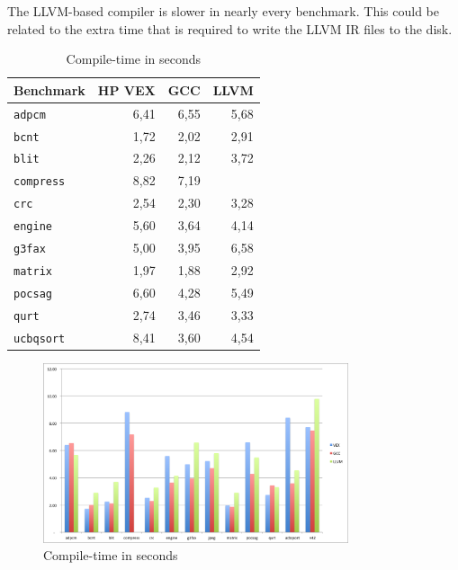 The LLVM-based compiler is slower in nearly every benchmark. This could be related to the extra time that is required to write the LLVM IR files to the disk. %

\begin{table}
  \centering
    \begin{tabular}{|l|r|r|r|}
    \hline
    \textbf{Benchmark} & \multicolumn{1}{|r|}{\textbf{HP VEX}} & \multicolumn{1}{|r|}{\textbf{GCC}}  & \multicolumn{1}{|r|}{\textbf{LLVM}} \\ \hline
	\texttt{adpcm} 		& 6,41 & 6,55 & 5,68 \\ \hline
	\texttt{bcnt} 		& 1,72 & 2,02 & 2,91 \\ \hline
	\texttt{blit} 		& 2,26 & 2,12 & 3,72 \\ \hline
	\texttt{compress} 	& 8,82 & 7,19 & \\ \hline
	\texttt{crc} 		& 2,54 & 2,30 & 3,28 \\ \hline
	\texttt{engine} 	& 5,60 & 3,64 & 4,14 \\ \hline
	\texttt{g3fax} 		& 5,00 & 3,95 & 6,58 \\ \hline
	\texttt{matrix} 	& 1,97 & 1,88 & 2,92 \\ \hline
	\texttt{pocsag} 	& 6,60 & 4,28 & 5,49 \\ \hline
	\texttt{qurt}	 	& 2,74 & 3,46 & 3,33 \\ \hline
	\texttt{ucbqsort} 	& 8,41 & 3,60 & 4,54 \\ \hline
    \end{tabular}
  \caption{Compile-time in seconds}
  \label{tbl:compile-time}
\end{table}

\begin{figure}[ht]
\centering
\includegraphics[width=0.8\textwidth]{5_results/img/compile-time.png}
\caption{Compile-time in seconds}
\label{fig:compile-time}
\end{figure}

